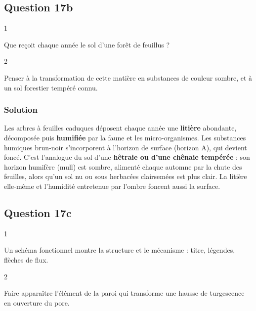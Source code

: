\documentclass[11pt,a4paper]{article}
\begin{document}
\hypertarget{question-17b}{%
\subsection{Question 17b}\label{question-17b}}

\begin{indication}{1}

Que reçoit chaque année le sol d'une forêt de feuillus ?

\end{indication}

\begin{indication}{2}

Penser à la transformation de cette matière en substances de couleur sombre, et à un sol forestier tempéré connu.

\end{indication}

\hypertarget{solution-48}{%
\subsubsection{Solution}\label{solution-48}}

Les arbres à feuilles caduques déposent chaque année une \textbf{litière} abondante, décomposée puis \textbf{humifiée} par la faune et les micro-organismes. Les substances humiques brun-noir s'incorporent à l'horizon de surface (horizon A), qui devient foncé. C'est l'analogue du sol d'une \textbf{hêtraie ou d'une chênaie tempérée} : son horizon humifère (mull) est sombre, alimenté chaque automne par la chute des feuilles, alors qu'un sol nu ou sous herbacées clairsemées est plus clair. La litière elle-même et l'humidité entretenue par l'ombre foncent aussi la surface.

\hypertarget{question-17c}{%
\subsection{Question 17c}\label{question-17c}}

\begin{indication}{1}

Un schéma fonctionnel montre la structure et le mécanisme : titre, légendes, flèches de flux.

\end{indication}

\begin{indication}{2}

Faire apparaître l'élément de la paroi qui transforme une hausse de turgescence en ouverture du pore.

\end{indication}
\end{document}
